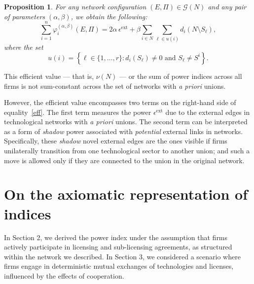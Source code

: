 \documentclass[preprint,11pt,authoryear]{elsarticle}
\theoremstyle{plain}
\newtheorem{proposition}[theorem]{Proposition}
\begin{document}
\begin{proposition}
\label{totalpower}
For any network configuration \( (E, \Pi) \in \mathcal{G}(N) \) and any pair of parameters \( (\alpha, \beta) \), we obtain the following:
\begin{equation} \label{eff} 
\sum_{i=1}^n \varphi_i^{(\alpha,\beta)}(E, \Pi)= 2 \alpha\,\epsilon^{\text{ext}} + \beta \sum_{i \in N} \sum_{\ell \in u(i)} d_i(N \setminus S_\ell),
\end{equation}
where the set 
\[
u(i)  = \left\{ \ell \in \{1, \ldots, r\} : d_i(S_\ell) \neq 0 \text{ and } S_\ell \neq S^i \right\}.
\]
\end{proposition}

This efficient value — that is, $\nu(N)$ — or the sum of power indices across all firms is not sum-constant across the set of networks with \emph{a priori} unions.  

However, the efficient value encompasses two terms on the right-hand side of equality~\eqref{eff}. The first term measures the power $\epsilon^{\text{ext}}$ due to the external edges in technological networks with \emph{a priori} unions. The second term can be interpreted as a form of \textit{shadow} power associated with \textit{potential} external links in networks. Specifically, these \textit{shadow} novel external edges are the ones visible if firms unilaterally transition from one technological sector to another union; and such a move is allowed only if they are connected to the union in the original network.


\section{On the axiomatic representation of  indices}\label{Axioms}

In Section 2, we derived the power index under the assumption that firms actively participate in licensing and sub-licensing agreements, as structured within the network we described. In Section 3, we considered a scenario where firms engage in deterministic mutual exchanges of technologies and licenses, influenced by the effects of cooperation. 
\end{document}
